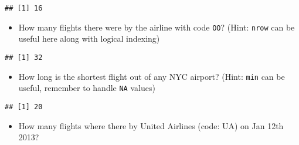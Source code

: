 \documentclass[
]{article}
\newenvironment{Shaded}{\begin{snugshade}}{\end{snugshade}}
\newcommand{\DataTypeTok}[1]{\textcolor[rgb]{0.13,0.29,0.53}{#1}}
\newcommand{\KeywordTok}[1]{\textcolor[rgb]{0.13,0.29,0.53}{\textbf{#1}}}
\newcommand{\NormalTok}[1]{#1}
\newcommand{\OperatorTok}[1]{\textcolor[rgb]{0.81,0.36,0.00}{\textbf{#1}}}
\newcommand{\OtherTok}[1]{\textcolor[rgb]{0.56,0.35,0.01}{#1}}
\newcommand{\StringTok}[1]{\textcolor[rgb]{0.31,0.60,0.02}{#1}}
\providecommand{\tightlist}{%
  \setlength{\itemsep}{0pt}\setlength{\parskip}{0pt}}
\begin{document}
\begin{Shaded}
\end{Shaded}

\begin{verbatim}
## [1] 16
\end{verbatim}

\begin{itemize}
\tightlist
\item
  How many flights there were by the airline with code \texttt{OO}?
  (Hint: \texttt{nrow} can be useful here along with logical indexing)
\end{itemize}

\begin{Shaded}
\end{Shaded}

\begin{verbatim}
## [1] 32
\end{verbatim}

\begin{itemize}
\tightlist
\item
  How long is the shortest flight out of any NYC airport? (Hint:
  \texttt{min} can be useful, remember to handle \texttt{NA} values)
\end{itemize}

\begin{Shaded}
\end{Shaded}

\begin{verbatim}
## [1] 20
\end{verbatim}

\begin{itemize}
\tightlist
\item
  How many flights where there by United Airlines (code: UA) on Jan 12th
  2013?
\end{itemize}
\end{document}
